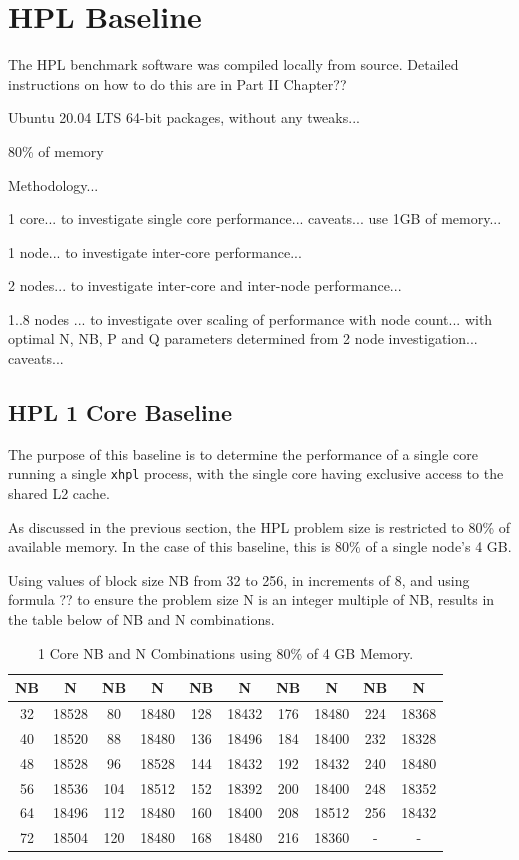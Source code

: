 \documentclass{report}
\begin{document}
%
%
\section{HPL Baseline}

The HPL benchmark software was compiled locally from source. Detailed instructions on how to do this are in Part II Chapter??

Ubuntu 20.04 LTS 64-bit packages, without any tweaks...

80\% of memory

Methodology...

1 core... to investigate single core performance... caveats... use 1GB of memory...

1 node... to investigate inter-core performance...

2 nodes... to investigate inter-core and inter-node performance...

1..8 nodes ... to investigate over scaling of performance with node count... with optimal N, NB, P and Q parameters determined from 2 node investigation... caveats...


%
%
\subsection{HPL 1 Core Baseline}

The purpose of this baseline is to determine the performance of a single core running a single \verb|xhpl| process, with the single core having exclusive access to the shared L2 cache. 

As discussed in the previous section, the HPL problem size is restricted to 80\% of available memory. In the case of this baseline, this is 80\% of a single node's 4 GB.

Using values of block size NB from 32 to 256, in increments of 8, and using formula ?? to ensure the problem size N is an integer multiple of NB, results in the table below of NB and N combinations.

\begin{table}[H]
\begin{center}
	\begin{tabular}{ |c|c|c|c|c|c|c|c|c|c| } 
		\hline
		NB & N & NB & N & NB & N & NB & N & NB & N \\ 
		\hline
		32 & 18528 &  80 & 18480 & 128 & 18432 & 176 & 18480 & 224 & 18368 \\ 
		40 & 18520 &  88 & 18480 & 136 & 18496 & 184 & 18400 & 232 & 18328 \\ 
 		48 & 18528 &  96 & 18528 & 144 & 18432 & 192 & 18432 & 240 & 18480 \\
		56 & 18536 & 104 & 18512 & 152 & 18392 & 200 & 18400 & 248 & 18352 \\ 
 		64 & 18496 & 112 & 18480 & 160 & 18400 & 208 & 18512 & 256 & 18432 \\
		72 & 18504 & 120 & 18480 & 168 & 18480 & 216 & 18360 &   - &     - \\ 
 		\hline
	\end{tabular}
\end{center}
\caption{\label{tab:table-name}1 Core NB and N Combinations using 80\% of 4 GB Memory.}
\end{table}
\end{document}
